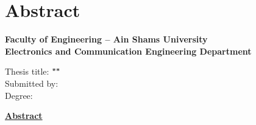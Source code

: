 % 
% 
%
\clearpage
\thispagestyle{empty}
\chapter*{Abstract}

\begin{center}
\textbf{Faculty of Engineering – Ain Shams University\\
Electronics and Communication Engineering Department }
\end{center}

\begin{flushleft}
Thesis title: \textbf{""} \\

Submitted by: \textbf{} \\

Degree: \textbf{} \\
\end{flushleft}

\begin{center}
\underline{\textbf{Abstract}}
\end{center}


